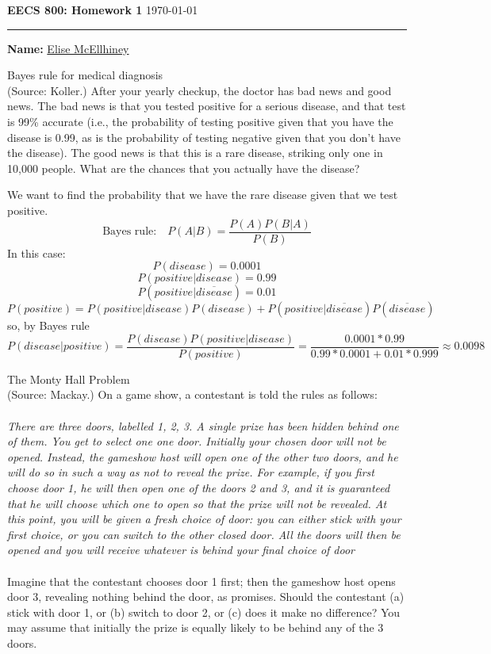 \documentclass[draft]{exam} %
\theoremstyle{definition} \newtheorem*{defn}{Definition}
\begin{document}
\noindent\textbf{\large{EECS 800: Homework 1}} \hfill \today
\hrule \bigskip
\noindent \textbf{Name:} \underline{Elise McEllhiney}

\begin{questions} \printanswers

 Bayes rule for medical diagnosis \\
(Source: Koller.) After your yearly checkup, the doctor has bad news and good news.  The bad news is that you tested positive for a serious disease, and that test is 99\% accurate (i.e., the probability of testing positive given that you have the disease is 0.99, as is the probability of testing negative given that you don't have the disease).  The good news is that this is a rare disease, striking only one in 10,000 people.  What are the chances that you actually have the disease?

\begin{solution}  %
We want to find the probability that we have the rare disease given that we test positive.
$$\text{Bayes rule:} \quad P(A|B) =\frac{P(A)P(B|A)}{P(B)} $$
In this case:
$$P(disease) = 0.0001$$
$$P(positive | disease) = 0.99$$
$$P(positive| \overline{disease}) = 0.01$$
$$P(positive) = P(positive|disease)P(disease)+P(positive|\overline{disease})P(\overline{disease})$$
so, by Bayes rule
$$P(disease|positive) =\frac{P(disease)P(positive|disease)}{P(positive)} =\frac{0.0001*0.99}{0.99*0.0001+0.01*0.999}\approx0.0098$$
\end{solution}

 The Monty Hall Problem \\
(Source: Mackay.) On a game show, a contestant is told the rules as follows: \\\\
\textit{There are three doors, labelled 1, 2, 3.  A single prize has been hidden behind one of them.  You get to select one one door.  Initially your chosen door will not be opened.  Instead, the gameshow host will open one of the other two doors, and he will do so in such a way as not to reveal the prize.  For example, if you first choose door 1, he will then open one of the doors 2 and 3, and it is guaranteed that he will choose which one to open so that the prize will not be revealed.  At this point, you will be given a fresh choice of door: you can either stick with your first choice, or you can switch to the other closed door.  All the doors will then be opened and you will receive whatever is behind your final choice of door}\\\\
Imagine that the contestant chooses door 1 first; then the gameshow host opens door 3, revealing nothing behind the door, as promises.  Should the contestant (a) stick with door 1, or (b) switch to door 2, or (c) does it make no difference?  You may assume that initially the prize is equally likely to be behind any of the 3 doors.


\end{questions}
\end{document}

